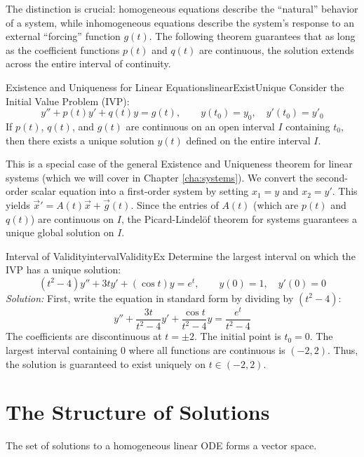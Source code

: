 \documentclass{book}
\newenvironment{Proof}[1][]
  {\begin{ProofTcb}[#1]}
  {\end{ProofTcb}}
\begin{document}
The distinction is crucial: homogeneous equations describe the ``natural'' behavior of a system, while
inhomogeneous equations describe the system's response to an external ``forcing'' function $g(t)$. The
following theorem guarantees that as long as the coefficient functions $p(t)$ and $q(t)$ are continuous, the
solution extends across the entire interval of continuity.

\begin{thm}{Existence and Uniqueness for Linear Equations}{linearExistUnique}
    Consider the Initial Value Problem (IVP):
    \[
        y'' + p(t)y' + q(t)y = g(t), \qquad y(t_0) = y_0, \quad y'(t_0) = y'_0
    \]
    If $p(t)$, $q(t)$, and $g(t)$ are continuous on an open interval $I$ containing $t_0$, then there exists a unique solution $y(t)$ defined on the entire interval $I$.
\end{thm}

\begin{Proof}
    This is a special case of the general Existence and Uniqueness theorem for linear systems (which we will cover in Chapter \ref{cha:systems}). We convert the second-order scalar equation into a first-order system by setting $x_1 = y$ and $x_2 = y'$. This yields $\vec{x}' = A(t)\vec{x} + \vec{g}(t)$. Since the entries of $A(t)$ (which are $p(t)$ and $q(t)$) are continuous on $I$, the Picard-Lindelöf theorem for systems guarantees a unique global solution on $I$.
\end{Proof}

\begin{example}{Interval of Validity}{intervalValidityEx}
    Determine the largest interval on which the IVP has a unique solution:
    \[
        (t^2 - 4)y'' + 3ty' + (\cos t)y = e^t, \qquad y(0) = 1, \quad y'(0) = 0
    \]
    \emph{Solution:}
    First, write the equation in standard form by dividing by $(t^2 - 4)$:
    \[
        y'' + \frac{3t}{t^2 - 4}y' + \frac{\cos t}{t^2 - 4}y = \frac{e^t}{t^2 - 4}
    \]
    The coefficients are discontinuous at $t = \pm 2$. The initial point is $t_0 = 0$. The largest interval containing $0$ where all functions are continuous is $(-2, 2)$. Thus, the solution is guaranteed to exist uniquely on $t \in (-2, 2)$.
\end{example}

\section{The Structure of Solutions}

The set of solutions to a homogeneous linear ODE forms a vector space.
\end{document}
